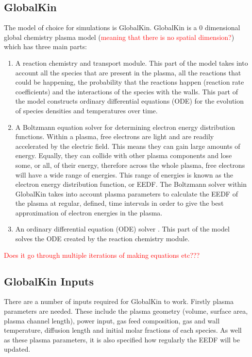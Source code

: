 \documentclass[11pt, oneside]{article}   	%
\begin{document}
\subsection{GlobalKin}
The model of choice for simulations is GlobalKin.
GlobalKin is a 0 dimensional global chemistry plasma model (\textcolor{red}{meaning that there is no spatial dimension?}) which has three main parts:
\begin{enumerate}
\item A reaction chemistry and transport module. 
This part of the model takes into account all the species that are present in the plasma, all the reactions that could be happening, the probability that the reactions happen (reaction rate coefficients) and the interactions of the species with the walls. 
This part of the model constructs ordinary differential equations (ODE) for the evolution of species densities and temperatures over time.
\item A Boltzmann equation solver for determining electron energy distribution functions. 
Within a plasma, free electrons are light and are readily accelerated by the electric field. 
This means they can gain large amounts of energy.
Equally, they can collide with other plasma components and lose some, or all, of their energy, therefore across the whole plasma, free electrons will have a wide range of energies.
This range of energies is known as the electron energy distribution function, or EEDF.
The Boltzmann solver within GlobalKin takes into account plasma parameters to calculate the EEDF of the plasma at regular, defined, time intervals in order to give the best approximation of electron energies in the plasma.
\item An ordinary differential equation (ODE) solver \cite{Stafford2004O2}.
This part of the model solves the ODE created by the reaction chemistry module.
\end{enumerate}

\textcolor{red}{Does it go through multiple iterations of making equations etc???}

\subsection{GlobalKin Inputs}
There are a number of inputs required for GlobalKin to work.
Firstly plasma parameters are needed.
These include the plasma geometry (volume, surface area, plasma channel length), power input, gas feed composition, gas and wall temperature, diffusion length and initial molar fractions of each species.
As well as these plasma parameters, it is also specified how regularly the EEDF will be updated.
\end{document}
